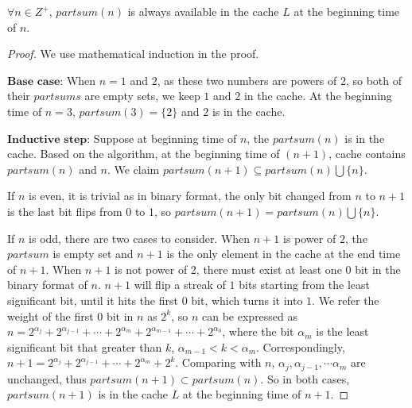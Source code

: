 \begin{lemma}
$\forall n\in Z^+$, $partsum(n)$ is always available in the cache $L$ at the beginning time of $n$.
\begin{proof}
We use mathematical induction in the proof.

$\textbf{Base case:}$ 
When $n=1$ and $2$, as these two numbers are powers of 2, so both of their $partsums$ are empty sets, we keep $1$ and $2$ in the cache.
At the beginning time of $n=3$, $partsum(3)=\{2\}$ and $2$ is in the cache.

$\textbf{Inductive step:}$
Suppose at beginning time of $n$, the $partsum(n)$ is in the cache. Based on the algorithm, at the beginning time of $(n+1)$, cache contains $partsum(n)$ and $n$. We claim $partsum(n+1) \subseteq partsum(n)\bigcup \{n\}$.

If $n$ is even, it is trivial as in binary format, the only bit changed from $n$ to $n+1$ is the last bit flips from $0$ to $1$, so $partsum(n+1) = partsum(n)\bigcup \{n\}$.

If $n$ is odd, there are two cases to consider.
When $n+1$ is power of $2$, the $partsum$ is empty set and $n+1$ is the only element in the cache at the end time of $n+1$. 
When $n+1$ is not power of 2, there must exist at least one $0$ bit in the binary format of $n$. $n+1$ will flip a streak of $1$ bits starting from the least significant bit, until it hits the first $0$ bit, which turns it into $1$. We refer the weight of the first $0$ bit in $n$ as $2^k$, so $n$ can be expressed as $n = 2^{\alpha_j}+2^{\alpha_{j-1}}+ \cdots + 2^{\alpha_m} + 2^{\alpha_{m-1}} + \cdots + 2^{\alpha_0}$, where the bit $\alpha_m$ is the least significant bit that greater than $k$, $\alpha_{m-1} < k < \alpha_{m}$. Correspondingly, $n+1 = 2^{\alpha_j}+2^{\alpha_{j-1}}+ \cdots + 2^{\alpha_m} + 2^k$. Comparing with $n$, $\alpha_j, \alpha_{j-1}, \cdots \alpha_m$ are unchanged, thus $partsum(n+1) \subset partsum(n)$. So in both cases, $partsum(n+1)$ is in the cache $L$ at the beginning time of $n+1$.
\end{proof}
\end{lemma}

